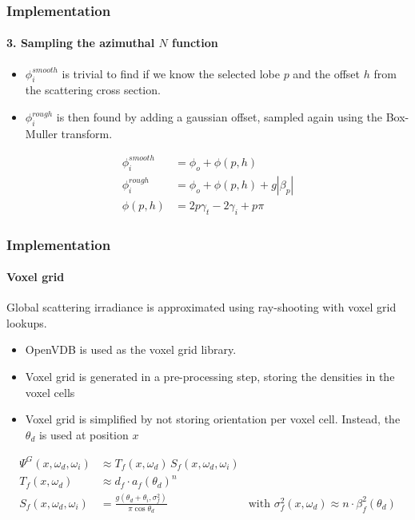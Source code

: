 \documentclass{beamer}
\begin{document}
   \begin{frame}
  \frametitle{Implementation}
  \framesubtitle{3. Sampling the azimuthal $N$ function}

 \begin{itemize}
  \item $\phi_i^{smooth}$ is trivial to find if we know the selected lobe $p$ and the offset $h$ from the scattering cross section.
  \item $\phi_i^{rough}$ is then found by adding a gaussian offset, sampled again using the Box-Muller transform.
\end{itemize}

\begin{align}
\phi_i^{smooth} &= \phi_o + \phi(p, h) \\
\phi_i^{rough} &= \phi_o + \phi(p, h) + g|\beta_p| \\
\phi(p,h) &= 2p\gamma_t - 2 \gamma_i + p\pi 
\end{align}



  \end{frame}
  
  \begin{frame}
    \frametitle{Implementation}
    \framesubtitle{Voxel grid}
    
	Global scattering irradiance is approximated using ray-shooting with voxel grid lookups.
	
   \begin{itemize}
    \item OpenVDB is used as the voxel grid library.
    \item Voxel grid is generated in a pre-processing step, storing the densities in the voxel cells
    \item Voxel grid is simplified by not storing orientation per voxel cell. Instead, the $\theta_d$ is used at position $x$
    \end{itemize}

\begin{align*}
\Psi^G(x, \omega_d, \omega_i) &\approx T_f(x, \omega_d)\,S_f(x, \omega_d, \omega_i) \\
T_f(x, \omega_d) &\approx d_f \cdot a_f(\theta_d)^n \\
S_f(x, \omega_d, \omega_i) &= \frac{g(\theta_d + \theta_i, \sigma_f^2)}{\pi \cos \theta_d}  & \text{with $\sigma_f^2(x, \omega_d) \approx n \cdot \beta_f^2(\theta_d)$} 
\end{align*}
  \end{frame}  
  
\end{document}

